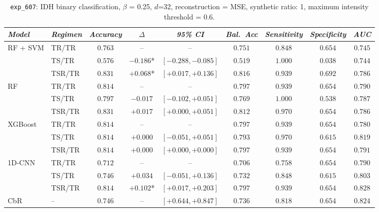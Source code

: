 \begin{table}[H]
\centering
\scriptsize

\label{tab:ctrl_exp_607}
\begin{tabular*}{\textwidth}{@{\extracolsep{\fill}}llccccccc}
\toprule
\emph{Model} & \emph{Regimen} & \emph{Accuracy} & \emph{$\Delta$} & \emph{95\% CI} & \emph{Bal.\ Acc} & \emph{Sensitivity} & \emph{Specificity} & \emph{AUC}\\
\midrule
\multirow{3}{*}{RF + SVM} & TR/TR & $0.763$ & -- & -- & $0.751$ & $0.848$ & $0.654$ & $0.745$\\
 & TS/TR & $0.576$ & $-0.186$* & $[-0.288, -0.085]$ & $0.519$ & $1.000$ & $0.038$ & $0.744$\\
 & TSR/TR & $0.831$ & $+0.068$* & $[+0.017, +0.136]$ & $0.816$ & $0.939$ & $0.692$ & $0.786$\\
\midrule
\multirow{3}{*}{RF} & TR/TR & $0.814$ & -- & -- & $0.797$ & $0.939$ & $0.654$ & $0.790$\\
 & TS/TR & $0.797$ & $-0.017$ & $[-0.102, +0.051]$ & $0.769$ & $1.000$ & $0.538$ & $0.787$\\
 & TSR/TR & $0.831$ & $+0.017$ & $[+0.000, +0.051]$ & $0.812$ & $0.970$ & $0.654$ & $0.786$\\
\midrule
\multirow{3}{*}{XGBoost} & TR/TR & $0.814$ & -- & -- & $0.797$ & $0.939$ & $0.654$ & $0.780$\\
 & TS/TR & $0.814$ & $+0.000$ & $[-0.051, +0.051]$ & $0.793$ & $0.970$ & $0.615$ & $0.819$\\
 & TSR/TR & $0.814$ & $+0.000$ & $[+0.000, +0.000]$ & $0.797$ & $0.939$ & $0.654$ & $0.791$\\
\midrule
\multirow{3}{*}{1D-CNN} & TR/TR & $0.712$ & -- & -- & $0.706$ & $0.758$ & $0.654$ & $0.790$\\
 & TS/TR & $0.746$ & $+0.034$ & $[-0.051, +0.136]$ & $0.732$ & $0.848$ & $0.615$ & $0.803$\\
 & TSR/TR & $0.814$ & $+0.102$* & $[+0.017, +0.203]$ & $0.797$ & $0.939$ & $0.654$ & $0.828$\\
\midrule
CbR & -- & $0.746$ & -- & $[+0.644, +0.847]$ & $0.736$ & $0.818$ & $0.654$ & $0.824$\\
\bottomrule
\end{tabular*}
\caption{\small \texttt{exp\_607}: IDH binary classification, $\beta$ = 0.25, $d$=32, reconstruction = MSE, synthetic ratio: 1, maximum intensity threshold = 0.6.}
\end{table}

